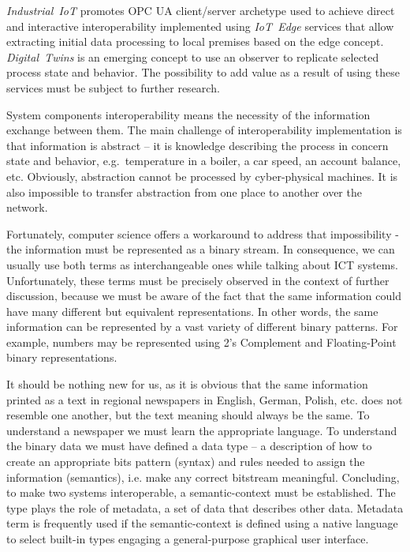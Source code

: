 \documentclass{article}
\begin{document}
\emph{Industrial\ IoT} promotes OPC UA client/server archetype used to achieve direct and interactive interoperability implemented using \emph{IoT\ Edge} services that allow extracting initial data processing to local premises based on the edge concept. \emph{Digital\ Twins} is an emerging concept to use an observer to replicate selected process state and behavior. The possibility to add value as a result of using these services must be subject to further research.

System components interoperability means the necessity of the information exchange between them. The main challenge of interoperability implementation is that information is abstract -- it is knowledge describing the process in concern state and behavior, e.g.~temperature in a boiler, a car speed, an account balance, etc. Obviously, abstraction cannot be processed by cyber-physical machines. It is also impossible to transfer abstraction from one place to another over the network.

Fortunately, computer science offers a workaround to address that impossibility - the information must be represented as a binary stream. In consequence, we can usually use both terms as interchangeable ones while talking about ICT systems. Unfortunately, these terms must be precisely observed in the context of further discussion, because we must be aware of the fact that the same information could have many different but equivalent representations. In other words, the same information can be represented by a vast variety of different binary patterns. For example, numbers may be represented using 2's Complement and Floating-Point binary representations.

It should be nothing new for us, as it is obvious that the same information printed as a text in regional newspapers in English, German, Polish, etc. does not resemble one another, but the text meaning should always be the same. To understand a newspaper we must learn the appropriate language. To understand the binary data we must have defined a data type -- a description of how to create an appropriate bits pattern (syntax) and rules needed to assign the information (semantics), i.e. make any correct bitstream meaningful. Concluding, to make two systems interoperable, a semantic-context must be established. The type plays the role of metadata, a set of data that describes other data. Metadata term is frequently used if the semantic-context is defined using a native language to select built-in types engaging a general-purpose graphical user interface.
\end{document}
